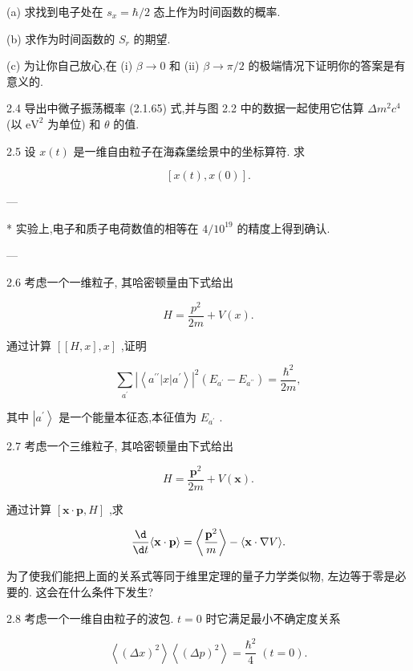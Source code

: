 \documentclass[lang=cn,newtx,10pt,scheme=chinese,thmcnt=section]{elegantbook}
\begin{document}
(a) 求找到电子处在 ${s}_{x} = \hbar /2$ 态上作为时间函数的概率.

(b) 求作为时间函数的 ${S}_{r}$ 的期望.

(c) 为让你自己放心,在 (i) $\beta \rightarrow 0$ 和 (ii) $\beta \rightarrow \pi /2$ 的极端情况下证明你的答案是有意义的.

2.4 导出中微子振荡概率 (2.1.65) 式,并与图 2.2 中的数据一起使用它估算 $\Delta {m}^{2}{c}^{4}$ (以 ${\mathrm{{eV}}}^{2}$ 为单位) 和 $\theta$ 的值.

2.5 设 $x\left( t\right)$ 是一维自由粒子在海森堡绘景中的坐标算符. 求

$$
\left\lbrack {x\left( t\right), x\left( 0\right) }\right\rbrack \text{.}
$$

---

* 实验上,电子和质子电荷数值的相等在 $4/{10}^{19}$ 的精度上得到确认.

---

2.6 考虑一个一维粒子, 其哈密顿量由下式给出

$$
H = \frac{{p}^{2}}{2m} + V\left( x\right) .
$$

通过计算 $\left\lbrack {\left\lbrack {H, x}\right\rbrack, x}\right\rbrack$ ,证明

$$
\mathop{\sum }\limits_{{a}^{\prime }}{\left| \left\langle {a}^{\prime \prime }\left| x\right| {a}^{\prime }\right\rangle \right| }^{2}\left( {{E}_{{a}^{\prime }} - {E}_{{a}^{\prime \prime }}}\right) = \frac{{\hbar }^{2}}{2m},
$$

其中 $\left| {a}^{\prime }\right\rangle$ 是一个能量本征态,本征值为 ${E}_{{a}^{\prime }}$ .

2.7 考虑一个三维粒子, 其哈密顿量由下式给出

$$
H = \frac{{\mathbf{p}}^{2}}{2m} + V\left( \mathbf{x}\right) .
$$

通过计算 $\left\lbrack {\mathbf{x} \cdot \mathbf{p}, H}\right\rbrack$ ,求

$$
\frac{\d}{\d t}\langle \mathbf{x} \cdot \mathbf{p}\rangle = \left\langle \frac{{\mathbf{p}}^{2}}{m}\right\rangle - \langle \mathbf{x} \cdot \nabla V\rangle .
$$

为了使我们能把上面的关系式等同于维里定理的量子力学类似物, 左边等于零是必要的. 这会在什么条件下发生?

2.8 考虑一个一维自由粒子的波包. $t = 0$ 时它满足最小不确定度关系

$$
\left\langle {\left( \Delta x\right) }^{2}\right\rangle \left\langle {\left( \Delta p\right) }^{2}\right\rangle = \frac{{\hbar }^{2}}{4}\;\left( {t = 0}\right) .
$$
\end{document}
